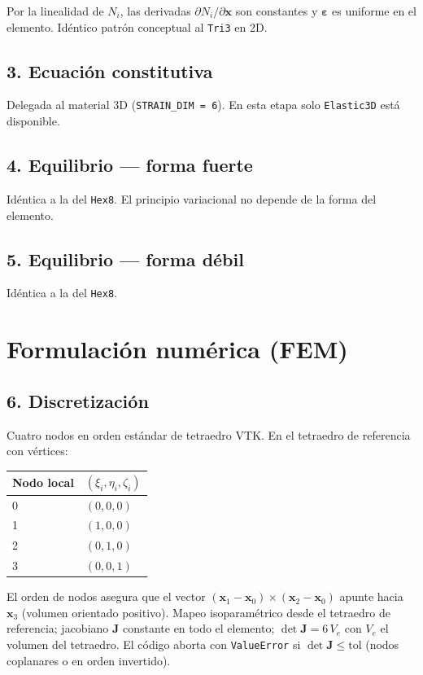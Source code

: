 \documentclass[11pt,letterpaper,oneside]{report}
\begin{document}
Por la linealidad de $N_i$, las derivadas $\partial N_i / \partial \mathbf x$ son constantes y $\boldsymbol\varepsilon$ es uniforme en el elemento. Idéntico patrón conceptual al \texttt{Tri3} en 2D.

\subsection{3. Ecuación constitutiva}

Delegada al material 3D (\texttt{STRAIN\_DIM = 6}). En esta etapa solo \texttt{Elastic3D} está disponible.

\subsection{4. Equilibrio --- forma fuerte}

Idéntica a la del \texttt{Hex8}. El principio variacional no depende de la forma del elemento.

\subsection{5. Equilibrio --- forma débil}

Idéntica a la del \texttt{Hex8}.


\section{Formulación numérica (FEM)}

\subsection{6. Discretización}

Cuatro nodos en orden estándar de tetraedro VTK. En el tetraedro de referencia con vértices:

\begin{center}
\begin{tabularx}{\textwidth}{YY}
\hline
\textbf{Nodo local} & \textbf{$(\xi_i, \eta_i, \zeta_i)$} \\
 & $(0, 0, 0)$ \\
1 & $(1, 0, 0)$ \\
2 & $(0, 1, 0)$ \\
3 & $(0, 0, 1)$ \\
\hline
\end{tabularx}
\end{center}
El orden de nodos asegura que el vector $(\mathbf x_1 - \mathbf x_0) \times (\mathbf x_2 - \mathbf x_0)$ apunte hacia $\mathbf x_3$ (volumen orientado positivo). Mapeo isoparamétrico desde el tetraedro de referencia; jacobiano $\mathbf J$ constante en todo el elemento; $\det\mathbf J = 6\,V_e$ con $V_e$ el volumen del tetraedro. El código aborta con \texttt{ValueError} si $\det\mathbf J \le \text{tol}$ (nodos coplanares o en orden invertido).
\end{document}

